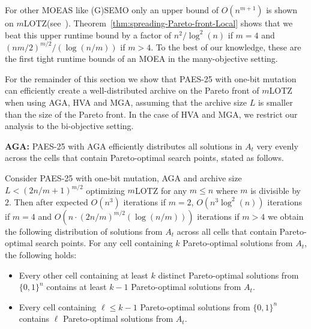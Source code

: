 \documentclass[
sigconf = false, %
review = false, %
screen = true, %
anonymous = true, %
format=acmsmall
]{acmart}
\newcommand{\mLOTZ}{\ensuremath{m}\text{-}\textsc{LOTZ}\xspace}
\newcommand{\PAES}{PAES-25\xspace}
\begin{document}
For other MOEAS like (G)SEMO only an upper bound of $O(n^{m+1})$ is shown on \mLOTZ (see~\cite{Laumanns2004,DoerrNearTight}). Theorem~\ref{thm:spreading-Pareto-front-Local} shows that we beat this upper runtime bound by a factor of $n^2/\log^2(n)$ if $m=4$ and $(nm/2)^{m/2}/(\log(n/m))$ if $m>4$. To the best of our knowledge, these are the first tight runtime bounds of an MOEA in the many-objective setting.

For the remainder of this section we show that \PAES with one-bit mutation can efficiently create a well-distributed archive on the Pareto front of \mLOTZ when using AGA, HVA and MGA, assuming that the archive size $L$ is smaller than the size of the Pareto front. In the case of HVA and MGA, we restrict our analysis to the bi-objective setting.

\textbf{AGA:} \PAES with AGA efficiently distributes all solutions in $A_t$ very evenly
across the cells that contain Pareto-optimal search points, stated as follows.

\begin{lemma}
\label{lem:spreading-Pareto-front-1-Bit-Mutation-AGA}
Consider \PAES with one-bit mutation, AGA and archive size $L < (2n/m+1)^{m/2}$ optimizing \mLOTZ for any $m \leq n$ where $m$ is divisible by $2$. Then after expected $O(n^3)$ iterations if $m=2$, $O(n^3\log^2(n))$ iterations if $m = 4$ and $O(n \cdot (2n/m)^{m/2}(\log(n/m)))$ iterations if $m>4$ we obtain the following distribution of solutions from $A_t$ across all cells that contain Pareto-optimal search points. For any cell containing $k$ Pareto-optimal solutions from $A_t$, the following holds: 
\begin{itemize}
    \item[(1)] Every other cell containing at least $k$ distinct Pareto-optimal solutions from $\{0,1\}^n$ contains at least $k-1$ Pareto-optimal solutions from $A_t$.
    \item[(2)] Every cell containing $\ell \leq k-1$ Pareto-optimal solutions from $\{0,1\}^n$ contains $\ell$ Pareto-optimal solutions from $A_t$.
\end{itemize}
\end{lemma}
\end{document}
